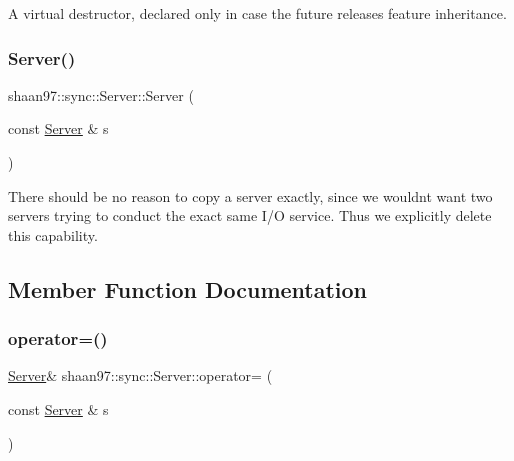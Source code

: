 A virtual destructor, declared only in case the future releases feature inheritance. 

\mbox{\label{classshaan97_1_1sync_1_1_server_a8b4a5707430edcd54c02b940bc95bc30}} 
\subsubsection{\texorpdfstring{Server()}{Server()}\hspace{0.1cm}{\footnotesize\ttfamily [2/2]}}
{\footnotesize\ttfamily shaan97\+::sync\+::\+Server\+::\+Server (\begin{DoxyParamCaption}\item[{const \hyperlink{classshaan97_1_1sync_1_1_server}{Server} \&}]{s }\end{DoxyParamCaption})\hspace{0.3cm}{\ttfamily [delete]}}

There should be no reason to copy a server exactly, since we wouldn\textquotesingle{}t want two servers trying to conduct the exact same I/O service. Thus we explicitly delete this capability. 

\subsection{Member Function Documentation}
\mbox{\label{classshaan97_1_1sync_1_1_server_ae5e4a1ad89562429b73ab4c398d5d2fb}} 
\subsubsection{\texorpdfstring{operator=()}{operator=()}}
{\footnotesize\ttfamily \hyperlink{classshaan97_1_1sync_1_1_server}{Server}\& shaan97\+::sync\+::\+Server\+::operator= (\begin{DoxyParamCaption}\item[{const \hyperlink{classshaan97_1_1sync_1_1_server}{Server} \&}]{s }\end{DoxyParamCaption})\hspace{0.3cm}{\ttfamily [delete]}}





